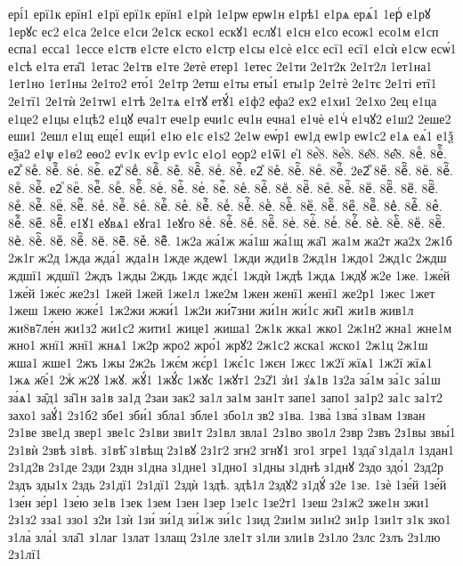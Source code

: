 {ері́1
ерї1к
ерїн1
е1рї
ерї1к
ерїн1
е1рѝ
1е1рѡ
ерѡ1н
е1рѣ1
е1рѧ
ерѧ́1
1ерⷭ
е1рꙋ
1ерꙋс
ес2
е1са
2е1се
е1си
2е1ск
еско1
ескꙋ1
еслꙋ1
е1сн
е1со
есож1
есо1м
е1сп
еспа1
есса1
1ессе
е1ств
е1сте
е1сто
е1стр
е1сы
е1сѐ
е1сє
есї1
есї1
е1сѝ
е1сѡ
есѡ́1
е1сѣ
е1та
ета̑1
1етас
2е1тв
е1те
2етѐ
етер1
1етес
2е1ти
2е1т2к
2е1т2л
1ет1на1
1ет1но
1ет1ны
2е1то2
ето́1
2е1тр
2етш
е1ты
еты́1
еты1р
2е1тѐ
2е1тє
2е1ті
етї1
2е1тї1
2е1тѝ
2е1тѡ1
е1тѣ
2е1тѧ
е1тꙋ
етꙋ́1
е1ф2
ефа2
ех2
е1хи1
2е1хо
2ец
е1ца
е1це2
е1цы
е1цѣ2
е1цꙋ
еча1т
ече1р
ечи1с
еч1н
ечна1
е1чѐ
е1чⷭ
е1чꙋ2
е1ш2
2еше2
еши1
2ешл
е1щ
еще́1
ещи́1
е1ю
е1є
е1ѕ2
2е1ѡ
еѡ́р1
еѡ1д
еѡ1р
еѡ1с2
е1ѧ
еѧ́1
е1ѯ
еѯа2
е1ѱ
е1ѳ2
еѳо2
еѵ1к
еѵ1р
еѵ1с
е1ѻ1
еѻр2
е1ѿ1
е҆1
8е҆̀8.
8е҆́8.
8е҆̈8.
8е҆̑8.
8еⷠ.
8еⷠ҇.
е2ⷡ
8еⷡ.
8еⷡ҇.
8еⷢ.
8еⷢ҇.
е2ⷣ
8еⷣ.
8еⷣ҇.
8еⷤ.
8еⷤ҇.
8еⷥ.
8еⷥ҇.
е2ⷦ
8еⷦ.
8еⷦ҇.
8еⷧ.
8еⷧ҇.
2е2ⷨ
8еⷨ.
8еⷨ҇.
8еⷩ.
8еⷩ҇.
8еⷪ.
8еⷪ҇.
е2ⷫ
8еⷫ.
8еⷫ҇.
8еⷬ.
8еⷬ҇.
8еⷭ.
8еⷭ҇.
8еⷮ.
8еⷮ҇.
8еⷯ.
8еⷯ҇.
8еⷰ.
8еⷰ҇.
8еⷱ.
8еⷱ҇.
8еⷲ.
8еⷲ҇.
8еⷳ.
8еⷳ҇.
8еⷴ.
8еⷴ҇.
8еⷵ.
8еⷵ҇.
8еⷶ.
8еⷶ҇.
8еⷷ.
8еⷷ҇.
8еⷸ.
8еⷸ҇.
8еⷹ.
8еⷹ҇.
8еⷺ.
8еⷺ҇.
8еⷻ.
8еⷻ҇.
8еⷼ.
8еⷼ҇.
8еⷽ.
8еⷽ҇.
8еⷾ.
8еⷾ҇.
8еⷿ.
8еⷿ҇.
е1ꙋ1
еꙋвѧ1
еꙋга1
1еꙋго
8еꙴ.
8еꙴ҇.
8еꙵ.
8еꙵ҇.
8еꙶ.
8еꙶ҇.
8еꙷ.
8еꙷ҇.
8еꙸ.
8еꙸ҇.
8еꙹ.
8еꙹ҇.
8еꙺ.
8еꙺ҇.
8еꙻ.
8еꙻ҇.
8е꙼.
8е꙼҇.
8е꙽.
8е꙽҇.
1ж2а
жа́1ж
жа́1ш
жа́1щ
жа̑1
жа1м
жа2т
жа2х
2ж1б
2ж1г
ж2д
1жда
жда́1
жда1н
1жде
ждеѡ1
1жди
жди1в
2жд1н
1ждо1
2жд1с
2ждш
ждшї1
ждшї1
2ждъ
1жды
2ждь
1ждє
ждє́1
1ждѝ
1ждѣ
1ждѧ
1ждꙋ
ж2е
1же.
1же́й
1же́й
1же́с
же2з1
1жей
1жей
1же1л
1же2м
1жен
женї1
женї1
же2р1
1жес
1жет
1жеш
1жею
жже́1
1ж2жи
жжи́1
1ж2и
жи́7зни
жи́1н
жи́1с
жи̑1
жи1в
жив1л
жи8в7ле́н
жи1з2
жи1с2
жити1
жице1
жиша1
2ж1к
жка1
жко1
2ж1н2
жна1
жне1м
жно1
жнї1
жнї1
жнѧ1
1ж2р
жро2
жро́1
жрꙋ2
2ж1с2
жска1
жско1
2ж1ц
2ж1ш
жша1
жше1
2жъ
1жы
2ж2ь
1жє́м
жє́р1
1жє́1с
1жєн
1жєс
1ж2ї
жїѧ1
1ж2ї
жїѧ1
1жѧ
ж҃е́1
2жⷭ
ж2ꙋ
1жꙋ.
жꙋ́1
1жꙋ́с
1жꙋс
1жꙋт1
2з2̾1
з̾и1
з̾ѧ1в
1з2а
за́1м
за́1с
за́1ш
за́ѧ1
за̑д1
за̑1н
за1в
за1д
2заи
зак2
за1л
за1м
зан1т
запе1
запо1
за1р2
за1с
за1т2
захо1
заꙋ́1
2з1б2
збе1
зби́1
збла1
збле1
збо1л
зв2
з1ва.
1зва̀
1зва́
з1вам
1зван
2з1ве
зве1д
звер1
зве1с
2з1ви
зви1т
2з1вл
звла1
2з1во
зво1л
2звр
2звъ
2з1вы
звы́1
2з1вѝ
2звѣ
з1вѣ.
з1вѣ̑
з1вѣщ
2з1вꙋ
2з1г2
згн2
згнꙋ1
зго1
згре1
1зда̑
з1да1л
1здан1
2з1д2в
2з1де
2зди
2здн
з1дна
з1дне1
з1дно1
з1дны
з1днѣ
з1днꙋ
2здо
здо́1
2зд2р
2здъ
зды1х
2здь
2з1дї1
2з1дї1
2здѝ
1здѣ.
здѣ1л
2здꙋ2
з1дꙋ́
з2е
1зе.
1зѐ
1зе́й
1зе́й
1зе́н
зе́р1
1зе́ю
зе1в
1зек
1зем
1зен
1зер
1зе1с
1зе2т1
1зеш
2з1ж2
зже1н
зжи1
2з1з2
зза1
ззо1
з2и
1зѝ
1зи́
зи́1д
зи́1ж
зи́1с
1зид
2зи1м
зи1н2
зи1р
1зи1т
з1к
зко1
з1ла̀
зла́1
зла̑1
з1лаг
1злат
1злащ
2з1ле
зле1т
з1ли
зли1в
2з1ло
2злс
2злъ
2з1лю
2з1лї1
}
